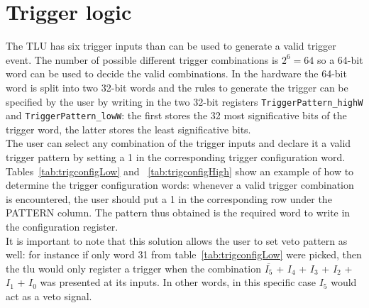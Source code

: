 \section{Trigger logic}\label{ch:triggerLogic}
The TLU has six trigger inputs than can be used to generate a valid trigger event. The number of possible different trigger combinations is $2^6= 64$ so a 64-bit word can be used to decide the valid combinations. In the hardware the 64-bit word is split into two 32-bit words and the rules to generate the trigger can be specified by the user by writing in the two 32-bit registers \verb|TriggerPattern_highW| and \verb|TriggerPattern_lowW|: the first stores the 32 most significative bits of the trigger word, the latter stores the least significative bits.\\
The user can select any combination of the trigger inputs and declare it a valid trigger pattern by setting a 1 in the corresponding trigger configuration word.
Tables~\ref{tab:trigconfigLow} and ~\ref{tab:trigconfigHigh} show an example of how to determine the trigger configuration words: whenever a valid trigger combination is encountered, the user should put a 1 in the corresponding row under the PATTERN column. The pattern thus obtained is the required word to write in the configuration register.\\
It is important to note that this solution allows the user to set veto pattern as well: for instance if only word 31 from table~\ref{tab:trigconfigLow} were picked, then the \gls{tlu} would only register a trigger when the combination $\overline{I_{5}}$ + $I_{4}$ + $I_{3}$ + $I_{2}$ + $I_{1}$ + $I_{0}$ was presented at its inputs. In other words, in this specific case $I_{5}$ would act as a veto signal.

